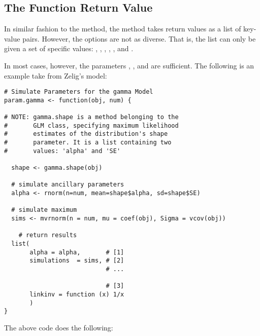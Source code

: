 
\subsection{The Function Return Value}

In similar fashion to the  method, the  method takes return values as a list of key-value pairs. However, the options are not as diverse. That is, the list can only be given a set of specific values: , , , , , and .

In most cases, however, the parameters , , and  are sufficient. The following is an example take from Zelig's  model:

\pagebreak
\begin{verbatim}
# Simulate Parameters for the gamma Model
param.gamma <- function(obj, num) {

# NOTE: gamma.shape is a method belonging to the
#       GLM class, specifying maximum likelihood
#       estimates of the distribution's shape
#       parameter. It is a list containing two
#       values: 'alpha' and 'SE'

  shape <- gamma.shape(obj)
	
  # simulate ancillary parameters
  alpha <- rnorm(n=num, mean=shape$alpha, sd=shape$SE)
  
  # simulate maximum
  sims <- mvrnorm(n = num, mu = coef(obj), Sigma = vcov(obj))

	# return results  
  list(
       alpha = alpha,       # [1]
       simulations  = sims, # [2]
                            # ...
                               
                            # [3]
       linkinv = function (x) 1/x
       )
}

\end{verbatim}

The above code does the following:

